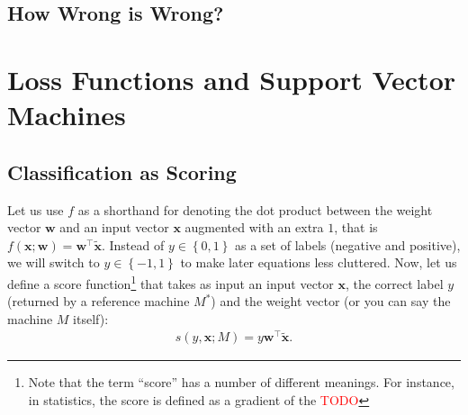 \documentclass{report}
\newcommand{\vect}[1]{\mathbf{#1}}
\newcommand{\vx}[0]{\vect{x}}
\newcommand{\vw}[0]{\vect{w}}
\newcommand{\todo}[1]{{\Large\textcolor{red}{#1}}}
\begin{document}
\todo{}

\subsection{How Wrong is Wrong?}

\todo{}

\section{Loss Functions and Support Vector Machines}

\subsection{Classification as Scoring}


Let us use $f$ as a shorthand for denoting the dot product between the weight
vector $\vw$ and an input vector $\vx$ augmented with an extra $1$, that is
$f(\vx; \vw) = \vw^\top \tilde{\vx}$. Instead of $y \in \left\{ 0, 1\right\}$ as
a set of labels (negative and positive), we will switch to $y \in \left\{ -1,
1\right\}$ to make later equations less cluttered. Now, let us define a score
function\footnote{
    Note that the term ``score'' has a number of different meanings. For
    instance, in statistics, the score is defined as a gradient of the
    \todo{TODO}
} that takes as input an input vector $\vx$, the correct label $y$ (returned by
a reference machine $M^*$) and the weight vector (or you can say the machine $M$
itself): 
\begin{align}
    \label{eq:lin_score}
    s(y, \vx; M) = y \vw^\top \tilde{\vx}.
\end{align}
\end{document}
